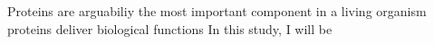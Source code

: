 Proteins are arguabiliy the most important component in a living organism proteins deliver biological functions   In this study, I will be 